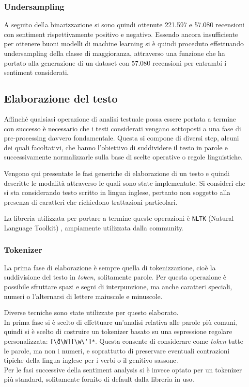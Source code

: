 \documentclass[hidelinks, 12pt]{article}
\begin{document}
\subsubsection{Undersampling}

A seguito della binarizzazione si sono quindi ottenute 221.597 e 57.080 recensioni con sentiment rispettivamente positivo e negativo. Essendo ancora insufficiente per ottenere buoni modelli di machine learning si è quindi proceduto effettuando undersampling della classe di maggioranza, attraverso una funzione che ha portato alla generazione di un dataset con 57.080 recensioni per entrambi i sentiment considerati.



\subsection{Elaborazione del testo}
\label{sec:text-elab}

Affinché qualsiasi operazione di analisi testuale possa essere portata a termine con successo è necessario che i testi considerati vengano sottoposti a una fase di pre-processing davvero fondamentale. Questa si compone di diversi step, alcuni dei quali facoltativi, che hanno l'obiettivo di suddividere il testo in parole e successivamente normalizzarle sulla base di scelte operative o regole linguistiche.

Vengono qui presentate le fasi generiche di elaborazione di un testo e quindi descritte le modalità attraverso le quali sono state implementate. Si consideri che si sta considerando testo scritto in lingua inglese, pertanto non soggetto alla presenza di caratteri che richiedono trattazioni particolari.

La libreria utilizzata per portare a termine queste operazioni è \texttt{NLTK} (Natural Language Toolkit) \cite{site:nltk}, ampiamente utilizzata dalla community.


\subsubsection{Tokenizer}

La prima fase di elaborazione è sempre quella di tokenizzazione, cioè la suddivisione del testo in \textit{token}, solitamente parole. Per questa operazione è possibile sfruttare spazi e segni di interpunzione, ma anche caratteri speciali, numeri o l'alternarsi di lettere maiuscole e minuscole.

Diverse tecniche sono state utilizzate per questo elaborato. \\
In prima fase si è scelto di effettuare un'analisi relativa alle parole più comuni, quindi si è scelto di costruire un tokenizer basato su una espressione regolare personalizzata: \texttt{[\^\textbackslash d\textbackslash W][\textbackslash w\textbackslash']*}. Questa consente di considerare come \textit{token} tutte le parole, ma non i numeri, e soprattutto di preservare eventuali contrazioni tipiche della lingua inglese per i verbi o il genitivo sassone. \\
Per le fasi successive della sentiment analysis si è invece optato per un tokenizer più standard, solitamente fornito di default dalla libreria in uso.
\end{document}
